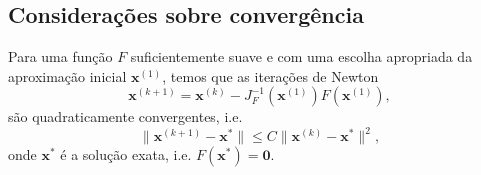 \begin{ex}
% 
\end{ex}

\subsection{Considerações sobre convergência}

Para uma função $F$ suficientemente suave e com uma escolha apropriada da aproximação inicial $\pmb{x}^{(1)}$, temos que as iterações de Newton
\begin{equation}
  \pmb{x}^{(k+1)} = \pmb{x}^{(k)} - J_F^{-1}(\pmb{x}^{(1)})F(\pmb{x}^{(1)}),
\end{equation}
são quadraticamente convergentes, i.e.
\begin{equation}
  \|\pmb{x}^{(k+1)} - \pmb{x}^*\| \leq C\|\pmb{x}^{(k)}-\pmb{x}^*\|^2,
\end{equation}
onde $\pmb{x}^*$ é a solução exata, i.e. $F(\pmb{x}^*) = \pmb{0}$.

